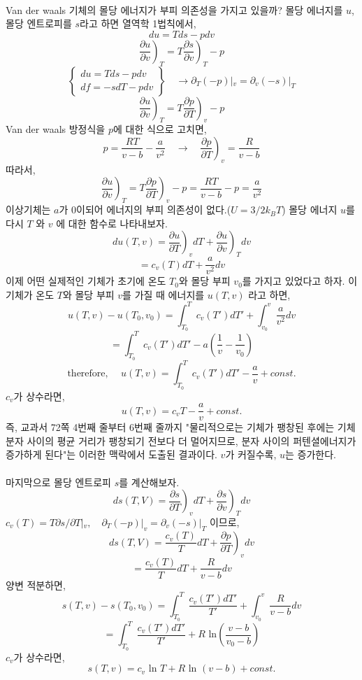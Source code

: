 \documentclass[a4paper,12pt]{article}
\begin{document}
\paragraph{}
Van der waals 기체의 몰당 에너지가 부피 의존성을 가지고 있을까? 몰당 에너지를 $u$, 몰당 엔트로피를 $s$라고 하면 열역학 1법칙에서,
$$du=Tds-pdv$$
$$\left. \frac{\partial u}{\partial v}\right) _{T}=T\left. \frac{\partial s}{\partial v}\right) _{T}-p$$
$$\begin{Bmatrix}
	du=Tds-pdv\\
	df=-sdT-pdv
\end{Bmatrix}\quad\rightarrow \partial_{T}(-p)|_{v}=\partial_{v}(-s)|_{T}$$ 
$$\left. \frac{\partial u}{\partial v}\right) _{T}=T\left. \frac{\partial p}{\partial T}\right) _{v}-p$$
Van der waals 방정식을 $p$에 대한 식으로 고치면,
$$p=\frac{RT}{v-b}-\frac{a}{v^2} \quad \longrightarrow \quad \left.\frac{\partial p}{\partial T}\right) _{v}=\frac{R}{v-b} $$
따라서,
$$\left. \frac{\partial u}{\partial v}\right) _{T}=T\left. \frac{\partial p}{\partial T}\right) _{v}-p=\frac{RT}{v-b}-p=\frac{a}{v^2}$$
이상기체는 $a$가 0이되어 에너지의 부피 의존성이 없다.($U=3/2k_BT$) 몰당 에너지 $u$를 다시 $T$ 와 $v$ 에 대한 함수로 나타내보자.
$$du(T,v)=\left.\frac{\partial u}{\partial T} \right)_{v}dT+\left.\frac{\partial u}{\partial v} \right)_{T}dv $$ 
$$=c_v(T)dT+\frac{a}{v^2}dv$$
이제 어떤 실제적인 기체가 초기에 온도 $T_0$와 몰당 부피 $v_0$를 가지고 있었다고 하자. 이 기체가 온도 $T$와 몰당 부피 $v$를 가질 때 에너지를 $u(T,v)$ 라고 하면,
$$u(T,v)-u(T_0,v_0)=\int_{T_0}^{T}c_v(T')dT'+\int_{v_0}^{v}\frac{a}{v^2}dv$$
$$=\int_{T_0}^{T}c_v(T')dT'-a\left(\frac{1}{v}-\frac{1}{v_0} \right) $$
$$\mbox{therefore, }\quad u(T,v)=\int_{T_0}^{T}c_v(T')dT'-\frac{a}{v}+const.$$
$c_v$가 상수라면,
$$u(T,v)=c_v T-\frac{a}{v}+const.$$
즉, 교과서 72쪽 4번째 줄부터 6번째 줄까지 "물리적으로는 기체가 팽창된 후에는 기체 분자 사이의 평균 거리가 팽창되기 전보다 더 멀어지므로, 분자 사이의 퍼텐셜에너지가 증가하게 된다"는 이러한 맥락에서 도출된 결과이다. $v$가 커질수록, $u$는 증가한다.
\paragraph{}
마지막으로 몰당 엔트로피 $s$를 계산해보자.
$$ds(T,V)=\left. \frac{\partial s}{\partial T}\right)_{v}dT+\left. \frac{\partial s}{\partial v}\right)_{T}dv $$
$c_v(T)=T\partial s/\partial T|_{v},\quad \partial_{T}(-p)|_{v}=\partial_{v}(-s)|_{T}$ 이므로,
$$ds(T,V)=\frac{c_v(T)}{T}dT+\left. \frac{\partial p}{\partial T}\right)_{v}dv$$
$$=\frac{c_v(T)}{T}dT+\frac{R}{v-b}dv$$
양변 적분하면,
$$s(T,v)-s(T_0,v_0)=\int_{T_0}^{T}\frac{c_v(T')dT'}{T'}+\int_{v_0}^{v}\frac{R}{v-b}dv$$
$$=\int_{T_0}^{T}\frac{c_v(T')dT'}{T'}+R\mbox{ ln}\left(\frac{v-b}{v_0-b} \right) $$
$ c_v$가 상수라면,
$$s(T,v)=c_v\mbox{ ln }T+R\mbox{ ln }(v-b)+const.$$
\end{document}
